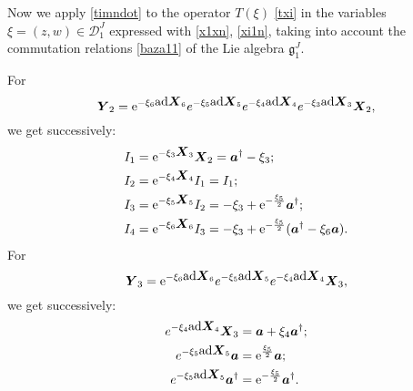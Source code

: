 \documentclass[12pt]{amsart}
\numberwithin{equation}{section}
\theoremstyle{definition}
\begin{document}
Now we apply \eqref{timndot} to the operator  $T(\xi)$ \eqref{txi}  in the
variables $\xi=(z,w)\in{{\mathcal{{D}}}}^J_1$ expressed with
\eqref{x1xn}, \eqref{xi1n},  taking into account  the commutation
relations \eqref{baza11} of the Lie algebra ${{\mathfrak{{g}}}}^J_1$.

For
$${{\mbox{\boldmath{${Y}$}}}}_2={{\mbox{\rm e}}}^{-\xi_6{{\mbox{\rm ad}}}{{\mbox{\boldmath{${X}$}}}}_6}e^{-\xi_5{{\mbox{\rm ad}}}{{\mbox{\boldmath{${X}$}}}}_5}e^{-\xi_4{{\mbox{\rm ad}}}{{\mbox{\boldmath{${X}$}}}}_4}e^{-\xi_3{{\mbox{\rm ad}}}{{\mbox{\boldmath{${X}$}}}}_3}{{\mbox{\boldmath{${X}$}}}}_2,$$
we get successively:
\begin{equation}
\begin{split}\label{fY2}
I_1 & = {{\mbox{\rm e}}}^{-\xi_3{{\mbox{\boldmath{${X}$}}}}_3}{{\mbox{\boldmath{${X}$}}}}_2={{\mbox{\boldmath{${a}$}}}}^{\dagger}-\xi_3;\\
I_2 & = {{\mbox{\rm e}}}^{-\xi_4{{\mbox{\boldmath{${X}$}}}}_4}I_1= I_1; \\
I_3 & = {{\mbox{\rm e}}}^{-\xi_5{{\mbox{\boldmath{${X}$}}}}_5}I_2=
-\xi_3+{{\mbox{\rm e}}}^{-\frac{\xi_5}{2}}{{\mbox{\boldmath{${a}$}}}}^{\dagger};\\
I_4& = {{\mbox{\rm e}}}^{-\xi_6{{\mbox{\boldmath{${X}$}}}}_6}I_3= -\xi_3+{{\mbox{\rm e}}}^{-\frac{\xi_5}{2}}({{\mbox{\boldmath{${a}$}}}}^{\dagger}-\xi_6{{\mbox{\boldmath{${a}$}}}}).
\end{split}
\end{equation}
For $${{\mbox{\boldmath{${Y}$}}}}_3={{\mbox{\rm e}}}^{-\xi_6{{\mbox{\rm ad}}}{{\mbox{\boldmath{${X}$}}}}_6}e^{-\xi_5{{\mbox{\rm ad}}}{{\mbox{\boldmath{${X}$}}}}_5}e^{-\xi_4{{\mbox{\rm ad}}}{{\mbox{\boldmath{${X}$}}}}_4}{{\mbox{\boldmath{${X}$}}}}_3,$$
we get successively:
\begin{equation}
\begin{split}\label{fY3}
e^{-\xi_4{{\mbox{\rm ad}}}{{\mbox{\boldmath{${X}$}}}}_4}{{\mbox{\boldmath{${X}$}}}}_3 & = {{\mbox{\boldmath{${a}$}}}}+\xi_4{{\mbox{\boldmath{${a}$}}}}^
{\dagger};\\
~~e^{-\xi_5{{\mbox{\rm ad}}}{{\mbox{\boldmath{${X}$}}}}_5}{{\mbox{\boldmath{${a}$}}}} & ={{\mbox{\rm e}}}^{\frac{\xi_5}{2}} {{\mbox{\boldmath{${a}$}}}}; \\
~e^{-\xi_5{{\mbox{\rm ad}}}{{\mbox{\boldmath{${X}$}}}}_5}{{\mbox{\boldmath{${a}$}}}}^{\dagger} & = {{\mbox{\rm e}}}^{-\frac{\xi_5}{2}} {{\mbox{\boldmath{${a}$}}}}^{\dagger}.
\end{split}
\end{equation}
\end{document}
